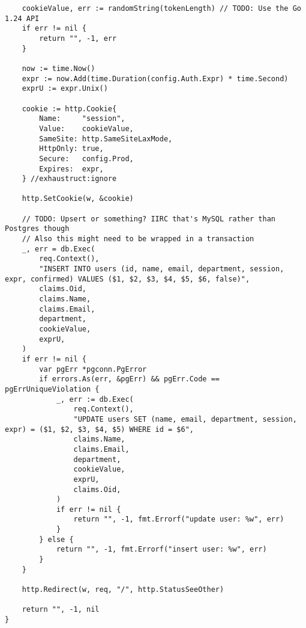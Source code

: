 \begin{verbatim}
	cookieValue, err := randomString(tokenLength) // TODO: Use the Go 1.24 API
	if err != nil {
		return "", -1, err
	}

	now := time.Now()
	expr := now.Add(time.Duration(config.Auth.Expr) * time.Second)
	exprU := expr.Unix()

	cookie := http.Cookie{
		Name:     "session",
		Value:    cookieValue,
		SameSite: http.SameSiteLaxMode,
		HttpOnly: true,
		Secure:   config.Prod,
		Expires:  expr,
	} //exhaustruct:ignore

	http.SetCookie(w, &cookie)

	// TODO: Upsert or something? IIRC that's MySQL rather than Postgres though
	// Also this might need to be wrapped in a transaction
	_, err = db.Exec(
		req.Context(),
		"INSERT INTO users (id, name, email, department, session, expr, confirmed) VALUES ($1, $2, $3, $4, $5, $6, false)",
		claims.Oid,
		claims.Name,
		claims.Email,
		department,
		cookieValue,
		exprU,
	)
	if err != nil {
		var pgErr *pgconn.PgError
		if errors.As(err, &pgErr) && pgErr.Code == pgErrUniqueViolation {
			_, err := db.Exec(
				req.Context(),
				"UPDATE users SET (name, email, department, session, expr) = ($1, $2, $3, $4, $5) WHERE id = $6",
				claims.Name,
				claims.Email,
				department,
				cookieValue,
				exprU,
				claims.Oid,
			)
			if err != nil {
				return "", -1, fmt.Errorf("update user: %w", err)
			}
		} else {
			return "", -1, fmt.Errorf("insert user: %w", err)
		}
	}

	http.Redirect(w, req, "/", http.StatusSeeOther)

	return "", -1, nil
}
\end{verbatim}

\printbibliography


